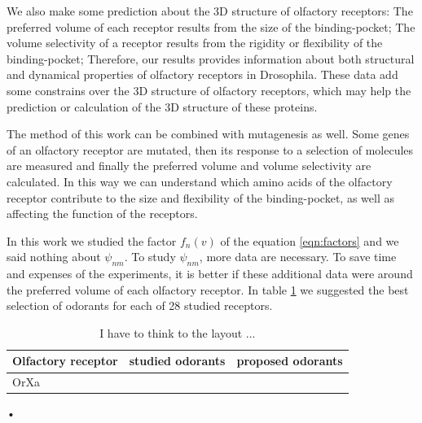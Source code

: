 \documentclass[11pt]{paper} %
\begin{document}
We also make some prediction about the 3D structure of olfactory receptors:
The preferred volume of each receptor results from the size of the binding-pocket; 
The volume selectivity of a receptor results from the rigidity or flexibility of the binding-pocket; 
Therefore, our results provides information about both structural and dynamical properties of olfactory receptors in Drosophila. 
These data add some constrains over the 3D structure of olfactory receptors, 
which may help the prediction or calculation of the 3D structure of these proteins. 

The method of this work can be combined with mutagenesis as well. 
Some genes of an olfactory receptor are mutated, 
then its response to a selection of molecules are measured and finally the preferred volume and volume selectivity are calculated.
In this way we can understand which amino acids of the olfactory receptor contribute to the size and flexibility of the binding-pocket, 
as well as affecting the function of the receptors.

In this work we studied the factor $f_n(v)$ of the equation \ref{eqn:factors} and we said nothing about $\psi_{nm}$. 
To study $\psi_{nm}$, more data are necessary. 
To save time and expenses of the experiments, 
it is better if these additional data were around the preferred volume of each olfactory receptor.
In table \ref{tab:receptor-odorant} we suggested the best selection of odorants for each of 28 studied receptors.

\begin{table}
	\begin{tabular}{|l|l|l|}
		\hline 
		Olfactory receptor & studied odorants & proposed odorants \\ \hline 
		OrXa & 
	\end{tabular}
	\caption{I have to think to the layout ...}
	\label{tab:receptor-odorant}
\end{table}•



\end{document}
